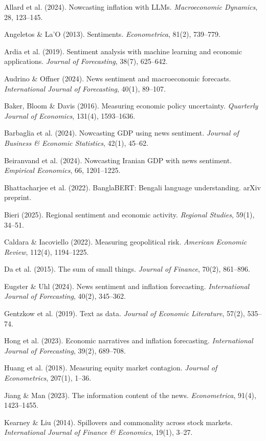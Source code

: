 \documentclass[11pt]{article}
\begin{document}
Allard et al. (2024). Nowcasting inflation with LLMs. \textit{Macroeconomic Dynamics}, 28, 123--145.

Angeletos \& La'O (2013). Sentiments. \textit{Econometrica}, 81(2), 739--779.

Ardia et al. (2019). Sentiment analysis with machine learning and economic applications. \textit{Journal of Forecasting}, 38(7), 625--642.

Audrino \& Offner (2024). News sentiment and macroeconomic forecasts. \textit{International Journal of Forecasting}, 40(1), 89--107.

Baker, Bloom \& Davis (2016). Measuring economic policy uncertainty. \textit{Quarterly Journal of Economics}, 131(4), 1593--1636.

Barbaglia et al. (2024). Nowcasting GDP using news sentiment. \textit{Journal of Business \& Economic Statistics}, 42(1), 45--62.

Beiranvand et al. (2024). Nowcasting Iranian GDP with news sentiment. \textit{Empirical Economics}, 66, 1201--1225.

Bhattacharjee et al. (2022). BanglaBERT: Bengali language understanding. arXiv preprint.

Bieri (2025). Regional sentiment and economic activity. \textit{Regional Studies}, 59(1), 34--51.

Caldara \& Iacoviello (2022). Measuring geopolitical risk. \textit{American Economic Review}, 112(4), 1194--1225.

Da et al. (2015). The sum of small things. \textit{Journal of Finance}, 70(2), 861--896.

Eugster \& Uhl (2024). News sentiment and inflation forecasting. \textit{International Journal of Forecasting}, 40(2), 345--362.

Gentzkow et al. (2019). Text as data. \textit{Journal of Economic Literature}, 57(2), 535--74.

Hong et al. (2023). Economic narratives and inflation forecasting. \textit{International Journal of Forecasting}, 39(2), 689--708.

Huang et al. (2018). Measuring equity market contagion. \textit{Journal of Econometrics}, 207(1), 1--36.

Jiang \& Man (2023). The information content of the news. \textit{Econometrica}, 91(4), 1423--1455.

Kearney \& Liu (2014). Spillovers and commonality across stock markets. \textit{International Journal of Finance \& Economics}, 19(1), 3--27.
\end{document}
